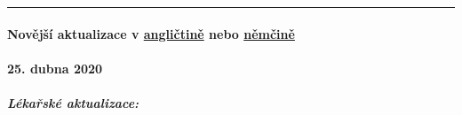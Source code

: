 \begin{center}\rule{0.5\linewidth}{\linethickness}\end{center}

\hypertarget{novux11bjux161uxed-aktualizace-v-angliux10dtinux11b-nebo-nux11bmux10dinux11b}{%
\paragraph{\texorpdfstring{Novější aktualizace v
\href{https://swprs.org/a-swiss-doctor-on-covid-19/}{angličtině} nebo
\href{https://swprs.org/covid-19-hinweis-ii/}{němčině}}{Novější aktualizace v angličtině nebo němčině}}\label{novux11bjux161uxed-aktualizace-v-angliux10dtinux11b-nebo-nux11bmux10dinux11b}}

\hypertarget{25-dubna-2020}{%
\paragraph{25. dubna 2020}\label{25-dubna-2020}}

\hypertarget{luxe9kaux159skuxe9-aktualizace}{%
\subparagraph{\texorpdfstring{\textbf{Lékařské
aktualizace:}}{Lékařské aktualizace:}}\label{luxe9kaux159skuxe9-aktualizace}}


